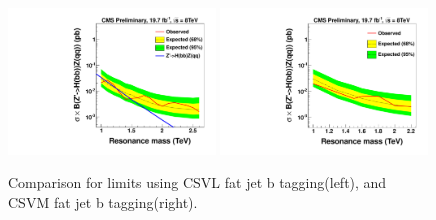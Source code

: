 \begin{figure}[h!tpb]
\begin{center}
\includegraphics[width=0.49\textwidth]{EXO-14-009/HbbZqqfigs/Limits/brazilianFlag_Hbb_HbbCombine.pdf}
\includegraphics[width=0.49\textwidth]{EXO-14-009/HbbZqqfigs/CSVMLimits/brazilianFlag_WZ_high_purityHbbCombineCSVM.pdf}
\end{center}
\caption{
Comparison for limits using CSVL fat jet b tagging(left), and CSVM fat jet b tagging(right). 
}
\label{fig:HbbLimitsCompare}
\end{figure}


\clearpage
